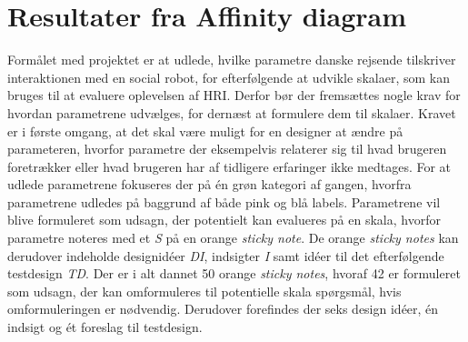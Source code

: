 \section{Resultater fra Affinity diagram}
\label{ParametreDatabehandlingAffinityDiagram}
%
%
Formålet med projektet er at udlede, hvilke parametre danske rejsende tilskriver interaktionen med en social robot, for efterfølgende at udvikle skalaer, som kan bruges til at evaluere oplevelsen af HRI. Derfor bør der fremsættes nogle krav for hvordan parametrene udvælges, for dernæst at formulere dem til skalaer. Kravet er i første omgang, at det skal være muligt for en designer at ændre på parameteren, hvorfor parametre der eksempelvis relaterer sig til hvad brugeren foretrækker eller hvad brugeren har af tidligere erfaringer ikke medtages. \blankline
%
For at udlede parametrene fokuseres der på én grøn kategori af gangen, hvorfra parametrene udledes på baggrund af både pink og blå labels. Parametrene vil blive formuleret som udsagn, der potentielt kan evalueres på en skala, hvorfor parametre noteres med et \textit{S} på en orange \textit{sticky note}. De orange \textit{sticky notes} kan derudover indeholde designidéer \textit{DI}, indsigter \textit{I} samt idéer til det efterfølgende testdesign \textit{TD}. Der er i alt dannet 50 orange \textit{sticky notes}, hvoraf 42 er formuleret som udsagn, der kan omformuleres til potentielle skala spørgsmål, hvis omformuleringen er nødvendig. Derudover forefindes der seks design idéer, én indsigt og ét foreslag til testdesign.
\newpage 
%
